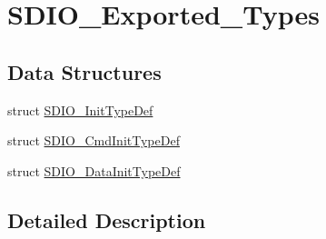 \hypertarget{group___s_d_i_o___exported___types}{}\section{S\+D\+I\+O\+\_\+\+Exported\+\_\+\+Types}
\label{group___s_d_i_o___exported___types}
\subsection*{Data Structures}
\begin{DoxyCompactItemize}
\item 
struct \mbox{\hyperlink{struct_s_d_i_o___init_type_def}{S\+D\+I\+O\+\_\+\+Init\+Type\+Def}}
\item 
struct \mbox{\hyperlink{struct_s_d_i_o___cmd_init_type_def}{S\+D\+I\+O\+\_\+\+Cmd\+Init\+Type\+Def}}
\item 
struct \mbox{\hyperlink{struct_s_d_i_o___data_init_type_def}{S\+D\+I\+O\+\_\+\+Data\+Init\+Type\+Def}}
\end{DoxyCompactItemize}


\subsection{Detailed Description}

